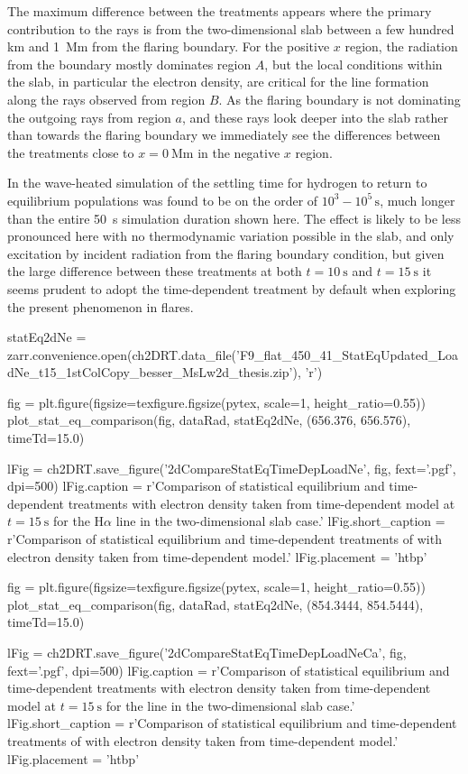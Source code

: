 The maximum difference between the treatments appears where the primary contribution to the rays is from the two-dimensional slab between a few hundred \si{\kilo\metre} and \SI{1}{\mega\metre} from the flaring boundary.
For the positive $x$ region, the radiation from the boundary mostly dominates region $A$, but the local conditions within the slab, in particular the electron density, are critical for the line formation along the rays observed from region $B$.
As the flaring boundary is not dominating the outgoing rays from region $a$, and these rays look deeper into the slab rather than towards the flaring boundary we immediately see the differences between the treatments close to $x=\SI{0}{\mega\metre}$ in the negative $x$ region.

In the wave-heated \Radyn{} simulation of \citet{Carlsson2002} the settling time for hydrogen to return to equilibrium populations was found to be on the order of $10^3-10^5\,\si{\second}$, much longer than the entire \SI{50}{\second} simulation duration shown here.
The effect is likely to be less pronounced here with no thermodynamic variation possible in the slab, and only excitation by incident radiation from the flaring boundary condition, but given the large difference between these treatments at both $t=\SI{10}{\second}$ and $t=\SI{15}{\second}$ it seems prudent to adopt the time-dependent treatment by default when exploring the present phenomenon in flares.

\begin{pycode}[2DRT]

statEq2dNe = zarr.convenience.open(ch2DRT.data_file('F9_flat_450_41_StatEqUpdated_LoadNe_t15_1stColCopy_besser_MsLw2d_thesis.zip'), 'r')

fig = plt.figure(figsize=texfigure.figsize(pytex, scale=1, height_ratio=0.55))
plot_stat_eq_comparison(fig, dataRad, statEq2dNe, (656.376, 656.576), timeTd=15.0)

lFig = ch2DRT.save_figure('2dCompareStatEqTimeDepLoadNe', fig, fext='.pgf', dpi=500)
lFig.caption = r'Comparison of statistical equilibrium and time-dependent treatments with electron density taken from time-dependent model at $t=\SI{15}{\second}$ for the H$\alpha$ line in the two-dimensional slab case.'
lFig.short_caption = r'Comparison of statistical equilibrium and time-dependent treatments of \Ha{} with electron density taken from time-dependent model.'
lFig.placement = 'htbp'

fig = plt.figure(figsize=texfigure.figsize(pytex, scale=1, height_ratio=0.55))
plot_stat_eq_comparison(fig, dataRad, statEq2dNe, (854.3444, 854.5444), timeTd=15.0)

lFig = ch2DRT.save_figure('2dCompareStatEqTimeDepLoadNeCa', fig, fext='.pgf', dpi=500)
lFig.caption = r'Comparison of statistical equilibrium and time-dependent treatments with electron density taken from time-dependent model at $t=\SI{15}{\second}$ for the \CaLine{} line in the two-dimensional slab case.'
lFig.short_caption = r'Comparison of statistical equilibrium and time-dependent treatments of \CaLine{} with electron density taken from time-dependent model.'
lFig.placement = 'htbp'
\end{pycode}


